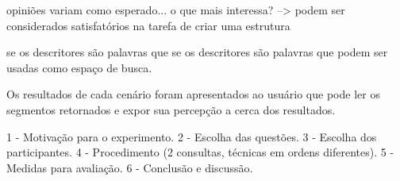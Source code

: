 opiniões variam como esperado...
o que mais interessa?
--> podem ser considerados satisfatórios na tarefa de criar uma estrutura 

se os descritores são palavras que 
se os descritores são palavras que podem ser usadas como espaço de busca.







Os resultados de cada cenário foram apresentados ao usuário que pode ler os segmentos retornados e expor sua percepção a cerca dos resultados.


 1 - Motivação para o experimento.
 2 - Escolha das questões.
 3 - Escolha dos participantes.
 4 - Procedimento (2 consultas, técnicas em ordens diferentes).
 5 - Medidas para avaliação.
 6 - Conclusão e discussão.



